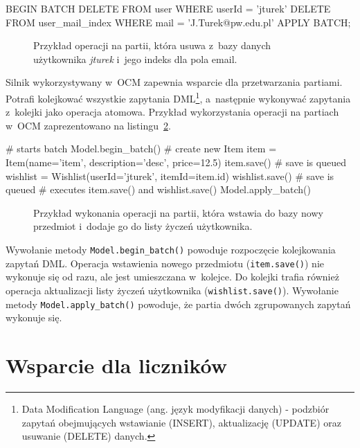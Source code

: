 \begin{verbbox}[\footnotesize]
	BEGIN BATCH
	  DELETE FROM user WHERE userId = 'jturek'
	  DELETE FROM user_mail_index WHERE mail = 'J.Turek@pw.edu.pl'
	APPLY BATCH;
\end{verbbox}

\begin{figure}[ht!]
	\centering
	\theverbbox
	\caption{Przykład operacji na partii, która usuwa z~bazy danych użytkownika \emph{jturek} i~jego indeks dla pola email.}
	\label{lst:batch_operation_cql_example}
\end{figure}

Silnik wykorzystywany w~OCM zapewnia wsparcie dla przetwarzania partiami. Potrafi kolejkować wszystkie zapytania DML\footnote{Data Modification Language (ang. język modyfikacji danych) - podzbiór zapytań obejmujących wstawianie (INSERT), aktualizację (UPDATE) oraz usuwanie (DELETE) danych.}, a~następnie wykonywać zapytania z~kolejki jako operacja atomowa. Przykład wykorzystania operacji na partiach w~OCM zaprezentowano na listingu~\ref{lst:ocm_batch_support}.

\begin{verbbox}[\footnotesize]
	# starts batch
	Model.begin_batch()
	# create new Item
	item = Item(name='item', description='desc', price=12.5)
	item.save()    # save is queued
	wishlist = Wishlist(userId='jturek', itemId=item.id)
	wishlist.save()    # save is queued
	# executes item.save() and wishlist.save()
	Model.apply_batch()
\end{verbbox}

\begin{figure}[ht!]
	\centering
	\theverbbox
	\caption{Przykład wykonania operacji na partii, która wstawia do bazy nowy przedmiot i~dodaje go do listy życzeń użytkownika.}
	\label{lst:ocm_batch_support}
\end{figure}

Wywołanie metody \verb+Model.begin_batch()+ powoduje rozpoczęcie kolejkowania zapytań DML. Operacja wstawienia nowego przedmiotu (\verb+item.save()+) nie wykonuje się od razu, ale jest umieszczana w~kolejce. Do kolejki trafia również operacja aktualizacji listy życzeń użytkownika (\verb+wishlist.save()+). Wywołanie metody \verb+Model.apply_batch()+ powoduje, że partia dwóch zgrupowanych zapytań wykonuje się.

\section{Wsparcie dla liczników}
\label{sec:ocm_counters}


